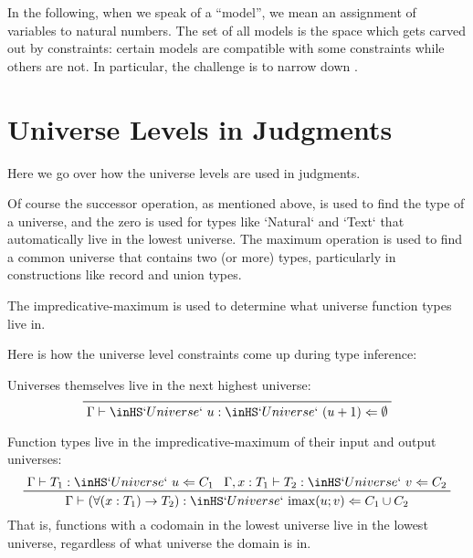 \documentclass[11pt, twoside, reqno]{book}
\DeclareMathOperator{\imax}{imax}
\begin{document}
In the following, when we speak of a ``model'', we mean an assignment of variables to natural numbers.
The set of all models is the space which gets carved out by constraints: certain models are compatible with some constraints while others are not.
In particular, the challenge is to narrow down .

\section{Universe Levels in Judgments}
\label{uni-lvl-prac}

Here we go over how the universe levels are used in judgments.

Of course the successor operation, as mentioned above, is used to find the type of a universe, and the zero is used for types like \inHS`Natural` and \inHS`Text` that automatically live in the lowest universe.
The maximum operation is used to find a common universe that contains two (or more) types, particularly in constructions like record and union types.

The impredicative-maximum is used to determine what universe function types live in.


Here is how the universe level constraints come up during type inference:

Universes themselves live in the next highest universe:
\begin{displaymath}
\prftree{\Gamma \vdash \inHS`Universe`\ u : \inHS`Universe`\ {(u+1)} \Leftarrow \emptyset}
\end{displaymath}

Function types live in the impredicative-maximum of their input and output universes:
\begin{displaymath}
\prftree
  {\Gamma \vdash T_1 : \inHS`Universe`\ u \Leftarrow C_1}
  {\Gamma, x : T_1 \vdash T_2 : \inHS`Universe`\ v \Leftarrow C_2}
  {\Gamma \vdash (\forall (x : T_1) \to T_2) : \inHS`Universe`\ {\imax(u; v)} \Leftarrow C_1 \cup C_2}
\end{displaymath}
That is, functions with a codomain in the lowest universe live in the lowest universe, regardless of what universe the domain is in.
\end{document}
